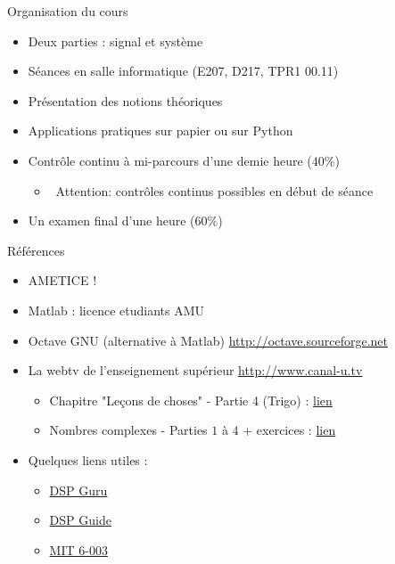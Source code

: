 \documentclass[a4paper,11pt]{beamer}
\begin{document}
\begin{frame}[plain]{Organisation du cours}
\begin{itemize}
	\item Deux parties : signal et système
	\item Séances en salle informatique (E207, D217, TPR1 00.11)
	\item Présentation des notions théoriques
	\item Applications pratiques sur papier ou sur Python
	\item Contrôle continu à mi-parcours d'une demie heure ($40\%$)
	\begin{itemize}
	    \item \faWarning\, Attention: contrôles continus possibles en début de séance
	\end{itemize}
	\item Un examen final d'une heure ($60\%$)
\end{itemize}
\end{frame}

\begin{frame}[plain]{Références}
\begin{itemize}
\item AMETICE !
\item Matlab : licence etudiants AMU
\item Octave GNU (alternative à Matlab)
		\url{http://octave.sourceforge.net}
\item\normalsize{La webtv de l'enseignement supérieur}
		\url{http://www.canal-u.tv}
\begin{itemize}
	\item Chapitre "Leçons de choses" - Partie 4 (Trigo) :
	\href{https://www.canal-u.tv/chaines/canal-unisciel/lecons-de-choses/chapitre-lecons-de-choses-partie-4-formules-de}{lien}
	\item Nombres complexes - Parties $1$ à $4$ + exercices : 
	\href{https://www.canal-u.tv/chaines/canal-unisciel/nombres-complexes}{lien}
\end{itemize}		
\item\normalsize{Quelques liens utiles :}
\begin{itemize}
	\item \href{http://www.dspguru.com}{DSP Guru}
	\item \href{http://www.dspguide.com/pdfbook.html}{DSP Guide}
	\item \href{https://ocw.mit.edu/courses/electrical-engineering-and-computer-science/6-003-signals-and-systems-fall-2011/index.htm}{MIT 6-003}
\end{itemize}	
\end{itemize}
\end{frame}
\end{document}
